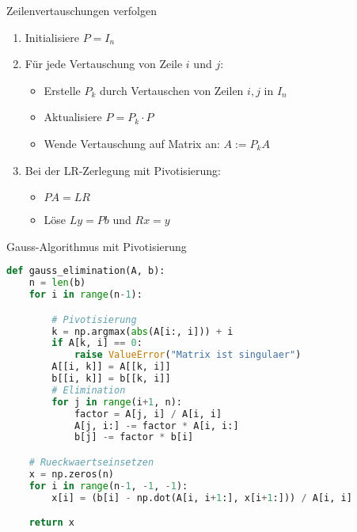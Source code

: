 \begin{KR}{Zeilenvertauschungen verfolgen}
\begin{enumerate}
    \item Initialisiere $P = I_n$
    \item Für jede Vertauschung von Zeile $i$ und $j$:
    \begin{itemize}
        \item Erstelle $P_k$ durch Vertauschen von Zeilen $i,j$ in $I_n$
        \item Aktualisiere $P = P_k \cdot P$
        \item Wende Vertauschung auf Matrix an: $A := P_kA$
    \end{itemize}
    \item Bei der LR-Zerlegung mit Pivotisierung:
    \begin{itemize}
        \item $PA = LR$ 
        \item Löse $Ly = Pb$ und $Rx = y$
    \end{itemize}
\end{enumerate}
\end{KR}

\begin{examplecode}{Gauss-Algorithmus mit Pivotisierung}
\begin{lstlisting}[language=Python, style=basesmol]
def gauss_elimination(A, b):
    n = len(b)
    for i in range(n-1):

        # Pivotisierung
        k = np.argmax(abs(A[i:, i])) + i
        if A[k, i] == 0:
            raise ValueError("Matrix ist singulaer")
        A[[i, k]] = A[[k, i]]
        b[[i, k]] = b[[k, i]]
        # Elimination
        for j in range(i+1, n):
            factor = A[j, i] / A[i, i]
            A[j, i:] -= factor * A[i, i:]
            b[j] -= factor * b[i]

    # Rueckwaertseinsetzen
    x = np.zeros(n)
    for i in range(n-1, -1, -1):
        x[i] = (b[i] - np.dot(A[i, i+1:], x[i+1:])) / A[i, i]

    return x
\end{lstlisting}
\end{examplecode}

